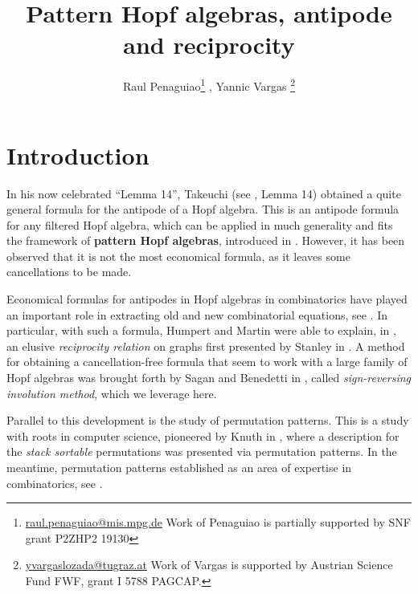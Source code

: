 \documentclass[submission]{FPSAC2023}
\title[Pattern Hopf algebras, antipode and reciprocity]{Pattern Hopf algebras, antipode and reciprocity}
\author[R. Penaguiao, Y. Vargas]{Raul Penaguiao\thanks{\href{mailto:raul.penaguiao@mis.mpg.de}{raul.penaguiao@mis.mpg.de} Work of Penaguiao is partially supported by SNF grant P2ZHP2
19130} \addressmark{1}, Yannic Vargas \thanks{\href{mailto:yvargaslozada@tugraz.at}{yvargaslozada@tugraz.at} Work of Vargas is supported by  Austrian Science Fund FWF, grant I 5788 PAGCAP.} \addressmark{2}}
\theoremstyle{definition}
\begin{document}
\maketitle



\section{Introduction}
In his now celebrated  ``Lemma 14'', Takeuchi (see \cite{Takeuchi1971}, Lemma 14) obtained a quite general formula for the antipode of a Hopf algebra. 
This is an antipode formula for any filtered Hopf algebra, which can be applied in much generality and fits the framework of \textbf{pattern Hopf algebras}, introduced in \cite{Penaguiao2020}.
However, it has been observed that it is not the most economical formula, as it leaves some cancellations to be made.


Economical formulas for antipodes in Hopf algebras in combinatorics have played an important role in extracting old and new combinatorial equations, see \cite{aguiar2017hopf, BS2017, humpert2012incidence, Schmitt1993, xu2022cancellation}.
In particular, with such a formula, Humpert and Martin were able to explain, in \cite{humpert2012incidence}, an elusive \textit{reciprocity relation} on graphs first presented by Stanley in \cite{stanley1975combinatorial}.
A method for obtaining a cancellation-free formula that seem to work with a large family of Hopf algebras was brought forth by Sagan and Benedetti in \cite{BS2017}, called \textit{sign-reversing involution method}, which we leverage here.

Parallel to this development is the study of permutation patterns.
This is a study with roots in computer science, pioneered by Knuth in \cite{Knuth}, where a description for the \textit{stack sortable} permutations was presented via permutation patterns.
In the meantime, permutation patterns established as an area of expertise in combinatorics, see \cite{linton2010permutation}.
\end{document}
